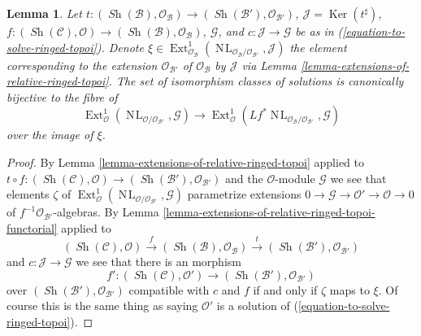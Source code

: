 \documentclass{stacks-project}
\theoremstyle{plain}
\newtheorem{lemma}[subsection]{Lemma}
\theoremstyle{definition}
\theoremstyle{remark}
\numberwithin{equation}{subsection}
\def\Ext{\mathop{\mathrm{Ext}}\nolimits}
\def\Sh{\mathop{\mathit{Sh}}\nolimits}
\def\NL{\mathop{N\!L}\nolimits}
\def\Ker{\mathop{\mathrm{Ker}}}
\begin{document}
\begin{lemma}
\label{lemma-parametrize-solutions-ringed-topoi}
Let $t : (\Sh(\mathcal{B}), \mathcal{O}_\mathcal{B}) \to
(\Sh(\mathcal{B}'), \mathcal{O}_{\mathcal{B}'})$,
$\mathcal{J} = \Ker(t^\sharp)$,
$f : (\Sh(\mathcal{C}), \mathcal{O}) \to
(\Sh(\mathcal{B}), \mathcal{O}_\mathcal{B})$, $\mathcal{G}$, and
$c : \mathcal{J} \to \mathcal{G}$ be as in
(\ref{equation-to-solve-ringed-topoi}).
Denote $\xi \in \Ext^1_{\mathcal{O}_\mathcal{B}}(
\NL_{\mathcal{O}_\mathcal{B}/\mathcal{O}_{\mathcal{B}'}}, \mathcal{J})$
the element corresponding to the extension $\mathcal{O}_{\mathcal{B}'}$
of $\mathcal{O}_\mathcal{B}$ by $\mathcal{J}$ via
Lemma \ref{lemma-extensions-of-relative-ringed-topoi}.
The set of isomorphism classes of solutions is canonically bijective
to the fibre of
$$
\Ext^1_\mathcal{O}(\NL_{\mathcal{O}/\mathcal{O}_{\mathcal{B}'}},
\mathcal{G})\to
\Ext^1_\mathcal{O}(
Lf^*\NL_{\mathcal{O}_\mathcal{B}/\mathcal{O}_{\mathcal{B}'}}, \mathcal{G})
$$
over the image of $\xi$.
\end{lemma}

\begin{proof}
By Lemma \ref{lemma-extensions-of-relative-ringed-topoi}
applied to $t \circ f : (\Sh(\mathcal{C}), \mathcal{O}) \to
(\Sh(\mathcal{B}'), \mathcal{O}_{\mathcal{B}'})$
and the $\mathcal{O}$-module $\mathcal{G}$
we see that elements $\zeta$ of
$\Ext^1_\mathcal{O}(\NL_{\mathcal{O}/\mathcal{O}_{\mathcal{B}'}},
\mathcal{G})$
parametrize extensions
$0 \to \mathcal{G} \to \mathcal{O}' \to \mathcal{O} \to 0$
of $f^{-1}\mathcal{O}_{\mathcal{B}'}$-algebras. By
Lemma \ref{lemma-extensions-of-relative-ringed-topoi-functorial} applied
to
$$
(\Sh(\mathcal{C}), \mathcal{O}) \xrightarrow{f}
(\Sh(\mathcal{B}), \mathcal{O}_\mathcal{B}) \xrightarrow{t}
(\Sh(\mathcal{B}'), \mathcal{O}_{\mathcal{B}'})
$$
and $c : \mathcal{J} \to \mathcal{G}$
we see that there is an morphism
$$
f' : 
(\Sh(\mathcal{C}), \mathcal{O}')
\longrightarrow
(\Sh(\mathcal{B}'), \mathcal{O}_{\mathcal{B}'})
$$
over $(\Sh(\mathcal{B}'), \mathcal{O}_{\mathcal{B}'})$
compatible with $c$ and $f$ if and only if
$\zeta$ maps to $\xi$. Of course this is the same thing as saying
$\mathcal{O}'$ is a solution of (\ref{equation-to-solve-ringed-topoi}).
\end{proof}
\end{document}
